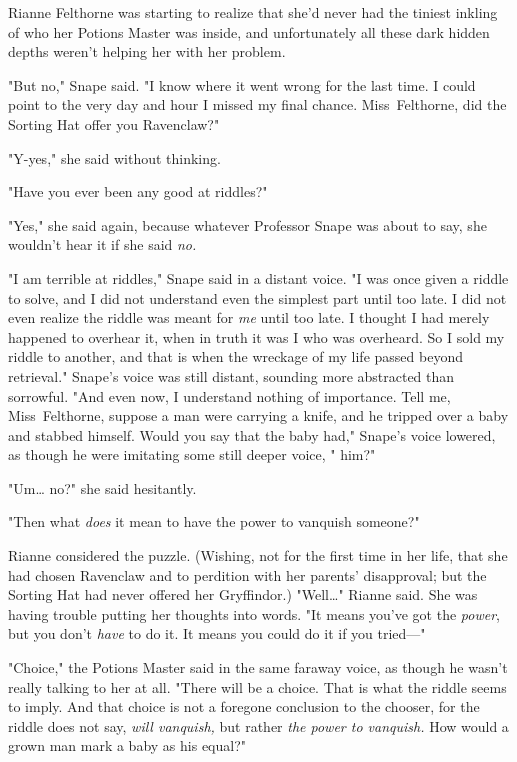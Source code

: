 Rianne Felthorne was starting to realize that she'd never had the tiniest
inkling of who her Potions Master was inside, and unfortunately all these dark
hidden depths weren't helping her with her problem.

"But no," Snape said. "I know where it went wrong for the last time. I could
point to the very day and hour I missed my final chance. Miss~Felthorne, did
the Sorting Hat offer you Ravenclaw?"

"Y-yes," she said without thinking.

"Have you ever been any good at riddles?"

"Yes," she said again, because whatever Professor Snape was about to say, she
wouldn't hear it if she said \emph{no.}

"I am terrible at riddles," Snape said in a distant voice. "I was once given a
riddle to solve, and I did not understand even the simplest part until too
late. I did not even realize the riddle was meant for \emph{me} until too late.
I thought I had merely happened to overhear it, when in truth it was I who was
overheard. So I sold my riddle to another, and that is when the wreckage of my
life passed beyond retrieval." Snape's voice was still distant, sounding more
abstracted than sorrowful. "And even now, I understand nothing of importance.
Tell me, Miss~Felthorne, suppose a man were carrying a knife, and he tripped
over a baby and stabbed himself. Would you say that the baby had," Snape's
voice lowered, as though he were imitating some still deeper voice, " him?"

"Um{\ldots} no?" she said hesitantly.

"Then what \emph{does} it mean to have the power to vanquish someone?"

Rianne considered the puzzle. (Wishing, not for the first time in her life,
that she had chosen Ravenclaw and to perdition with her parents' disapproval;
but the Sorting Hat had never offered her Gryffindor.) "Well{\ldots}" Rianne
said. She was having trouble putting her thoughts into words. "It means you've
got the \emph{power}, but you don't \emph{have} to do it. It means you could do
it if you tried---"

"Choice," the Potions Master said in the same faraway voice, as though he
wasn't really talking to her at all. "There will be a choice. That is what the
riddle seems to imply. And that choice is not a foregone conclusion to the
chooser, for the riddle does not say, \emph{will vanquish,} but rather
\emph{the power to vanquish.} How would a grown man mark a baby as his equal?"


